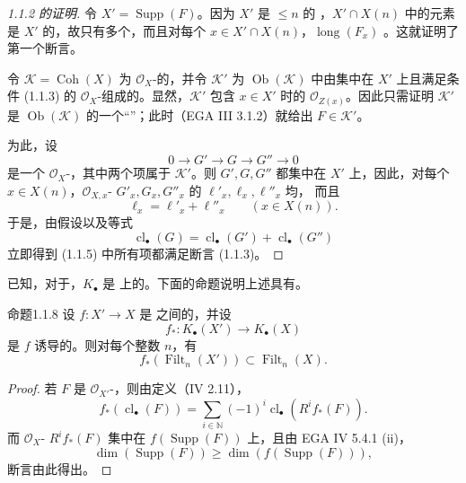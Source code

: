 \begin{proof}[1.1.2 的证明]
令 $X'=\operatorname{Supp}(F)$。因为 $X'$ 是 $\leq n$ 的  ，$X'\cap X(n)$ 中的元素是 $X'$ 的，故只有多个，而且对每个 $x\in X'\cap X(n)$，$\operatorname{long}(F_x)$ 。这就证明了第一个断言。

令 $\mathcal K=\operatorname{Coh}(X)$ 为 $\mathcal O_X$-的，并令 $\mathcal K'$ 为 $\operatorname{Ob}(\mathcal K)$ 中由集中在 $X'$ 上且满足条件 (1.1.3) 的 $\mathcal O_X$-组成的。显然，$\mathcal K'$ 包含 $x\in X'$ 时的 $\mathcal O_{Z(x)}$。因此只需证明 $\mathcal K'$ 是 $\operatorname{Ob}(\mathcal K)$ 的一个“”；此时（EGA III 3.1.2）就给出 $F\in\mathcal K'$。

为此，设
\[0\longrightarrow G'\longrightarrow G\longrightarrow G''\longrightarrow0\tag{1.1.5}\]
是一个 $\mathcal O_X$-，其中两个项属于 $\mathcal K'$。则 $G',G,G''$ 都集中在 $X'$ 上，因此，对每个 $x\in X(n)$，$\mathcal O_{X,x}$- $G'_x,G_x,G''_x$ 的 $\ell'_x,\ell_x,\ell''_x$ 均，
而且
\[\ell_x=\ell'_x+\ell''_x\qquad(x\in X(n)).\tag{1.1.6}\]
于是，由假设以及等式
\[\operatorname{cl}_\bullet(G)=\operatorname{cl}_\bullet(G')+\operatorname{cl}_\bullet(G'')\tag{1.1.7}\]
立即得到 (1.1.5) 中所有项都满足断言 (1.1.3)。
\end{proof}
已知，对于，$K_\bullet$ 是  上的。下面的命题说明上述具有。
\begin{SGAresult}{命题}{1.1.8}
设 $f:X'\longrightarrow X$ 是  之间的，并设
\[f_*:K_\bullet(X')\longrightarrow K_\bullet(X)\]
是 $f$ 诱导的。则对每个整数 $n$，有
\[f_*(\operatorname{Filt}_n(X'))\subset\operatorname{Filt}_n(X).\tag{1.1.9}\]
\end{SGAresult}
\begin{proof}
若 $F$ 是 $\mathcal O_{X'}$-，则由定义（IV 2.11），
\[f_*(\operatorname{cl}_\bullet(F))=\sum_{i\in\mathbb N}(-1)^i\operatorname{cl}_\bullet(R^if_*(F)).\]
而 $\mathcal O_X$- $R^if_*(F)$ 集中在 $f(\operatorname{Supp}(F))$ 上，且由 EGA IV 5.4.1 (ii)，
\[\dim(\operatorname{Supp}(F))\geq\dim(f(\operatorname{Supp}(F))),\]
断言由此得出。
\end{proof}
